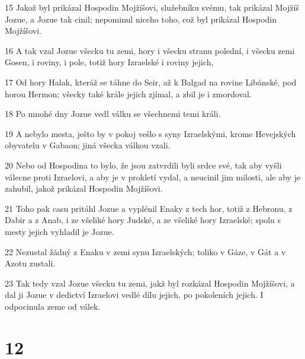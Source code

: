 \par 15 Jakož byl prikázal Hospodin Mojžíšovi, služebníku svému, tak prikázal Mojžíš Jozue, a Jozue tak cinil; nepominul niceho toho, což byl prikázal Hospodin Mojžíšovi.
\par 16 A tak vzal Jozue všecku tu zemi, hory i všecku stranu polední, i všecku zemi Gosen, i roviny, i pole, totiž hory Izraelské i roviny jejich,
\par 17 Od hory Halak, kteráž se táhne do Seir, až k Balgad na rovine Libánské, pod horou Hermon; všecky také krále jejich zjímal, a zbil je i zmordoval.
\par 18 Po mnohé dny Jozue vedl válku se všechnemi temi králi.
\par 19 A nebylo mesta, ješto by v pokoj vešlo s syny Izraelskými, krome Hevejských obyvatelu v Gabaon; jiná všecka válkou vzali.
\par 20 Nebo od Hospodina to bylo, že jsou zatvrdili byli srdce své, tak aby vyšli válecne proti Izraelovi, a aby je v prokletí vydal, a neucinil jim milosti, ale aby je zahubil, jakož prikázal Hospodin Mojžíšovi.
\par 21 Toho pak casu pritáhl Jozue a vyplénil Enaky z tech hor, totiž z Hebronu, z Dabir a z Anab, i ze všeliké hory Judské, a ze všeliké hory Izraelské; spolu s mesty jejich vyhladil je Jozue.
\par 22 Nezustal žádný z Enaku v zemi synu Izraelských; toliko v Gáze, v Gát a v Azotu zustali.
\par 23 Tak tedy vzal Jozue všecku tu zemi, jakž byl rozkázal Hospodin Mojžíšovi, a dal ji Jozue v dedictví Izraelovi vedlé dílu jejich, po pokoleních jejich. I odpocinula zeme od válek.

\chapter{12}

